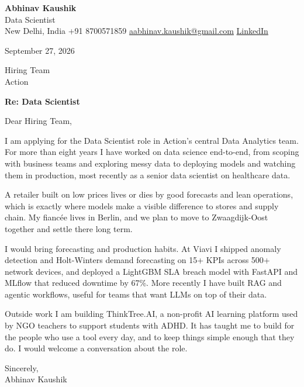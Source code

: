 \documentclass[11pt,a4paper]{article}
\begin{document}
{\Large\bfseries Abhinav Kaushik}\\
Data Scientist\\
New Delhi, India \textbar{} +91 8700571859 \textbar{} \href{mailto:aabhinav.kaushik@gmail.com}{aabhinav.kaushik@gmail.com} \textbar{} \href{https://www.linkedin.com/in/abhinav-kaushik10/}{LinkedIn}  

September 27, 2026

Hiring Team\\
Action

\textbf{Re: Data Scientist}

Dear Hiring Team,

I am applying for the Data Scientist role in Action's central Data Analytics team. For more than eight years I have worked on data science end-to-end, from scoping with business teams and exploring messy data to deploying models and watching them in production, most recently as a senior data scientist on healthcare data.

A retailer built on low prices lives or dies by good forecasts and lean operations, which is exactly where models make a visible difference to stores and supply chain. My fiancée lives in Berlin, and we plan to move to Zwaagdijk-Oost together and settle there long term.

I would bring forecasting and production habits. At Viavi I shipped anomaly detection and Holt-Winters demand forecasting on 15+ KPIs across 500+ network devices, and deployed a LightGBM SLA breach model with FastAPI and MLflow that reduced downtime by 67\%. More recently I have built RAG and agentic workflows, useful for teams that want LLMs on top of their data.

Outside work I am building ThinkTree.AI, a non-profit AI learning platform used by NGO teachers to support students with ADHD. It has taught me to build for the people who use a tool every day, and to keep things simple enough that they do. I would welcome a conversation about the role.

Sincerely,\\[4pt]
Abhinav Kaushik
\end{document}
